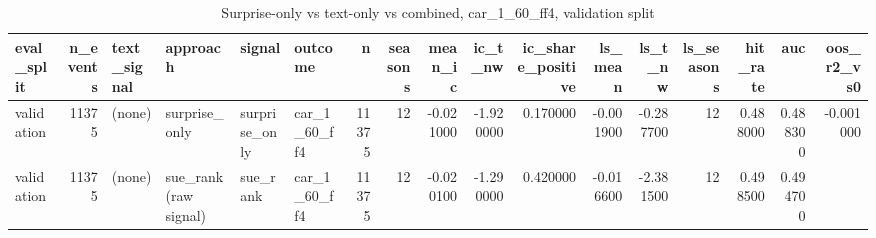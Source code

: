 \begin{table}
\caption{Surprise-only vs text-only vs combined, car_1_60_ff4, validation split}
\label{tab:t7_compare__car_1_60_ff4__validation}
\begin{tabular}{lrllllrrrrrrrrrrr}
\toprule
eval\_split & n\_events & text\_signal & approach & signal & outcome & n & seasons & mean\_ic & ic\_t\_nw & ic\_share\_positive & ls\_mean & ls\_t\_nw & ls\_seasons & hit\_rate & auc & oos\_r2\_vs0 \\
\midrule
validation & 11375 & (none) & surprise\_only & surprise\_only & car\_1\_60\_ff4 & 11375 & 12 & -0.021000 & -1.920000 & 0.170000 & -0.001900 & -0.287700 & 12 & 0.488000 & 0.488300 & -0.001000 \\
validation & 11375 & (none) & sue\_rank (raw signal) & sue\_rank & car\_1\_60\_ff4 & 11375 & 12 & -0.020100 & -1.290000 & 0.420000 & -0.016600 & -2.381500 & 12 & 0.498500 & 0.494700 &  \\
\bottomrule
\end{tabular}
\end{table}
